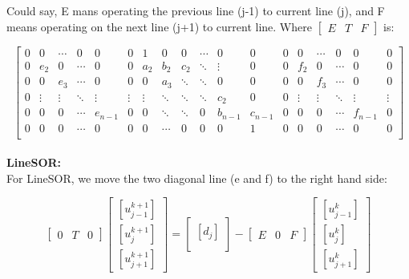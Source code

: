 \documentclass[12pt]{article}
\begin{document}
Could say, E mans operating the previous line (j-1) to current line (j), and F means operating on the next line (j+1) to current line. Where $\left[
\begin{array}{c|c|c}
E & T & F 
\end{array}
\right]$ is:


\[
\left[
\begin{array}{cccccc|cccccc|cccccc}
0 & 0 & \cdots & 0 & 0 & 0 & 1 & 0 & 0 & \cdots & 0 & 0 & 0 & 0 & \cdots & 0 & 0 & 0 \\
0 & e_{2} & 0 & \cdots & 0 & 0 & a_{2} & b_{2} & c_{2} & \ddots & \vdots & 0 & 0 & f_{2} & 0 & \cdots & 0 & 0 \\
0 & 0 & e_{3} & \cdots & 0 & 0 & 0 & a_{3} & \ddots & \ddots & 0 & 0 & 0 & 0 & f_{3} & \cdots & 0 & 0 \\
0 & \vdots & \vdots & \ddots & \vdots & \vdots & \vdots & \ddots & \ddots & \ddots & c_{2} & 0 & 0 & \vdots & \vdots & \ddots & \vdots & \vdots \\
0 & 0 & 0 & \cdots & e_{n-1} & 0 & 0 & \ddots & \ddots & 0 & b_{n-1} & c_{n-1} & 0 & 0 & 0 & \cdots & f_{n-1} & 0 \\
0 & 0 & 0 & \cdots & 0 & 0 & 0 & \cdots & 0 & 0 & 0 & 1 & 0 & 0 & 0 & \cdots & 0 & 0 \\
\end{array}
\right]
\]\\

\textbf{LineSOR:}\\

For LineSOR, we move the two diagonal line (e and f) to the right hand side:

\[
\left[
\begin{array}{c|c|c}
0 & T & 0 
\end{array}
\right]
\begin{bmatrix}
    [u_{j-1}^{k+1}] \\
    [u_{j}^{k+1}] \\
   [ u_{j+1}^{k+1}]
\end{bmatrix}
=
\begin{bmatrix}
    [d_{j}] \\
\end{bmatrix}
-
\left[
\begin{array}{c|c|c}
E & 0 & F 
\end{array}
\right]
\begin{bmatrix}
    [u_{j-1}^{k}] \\
    [u_{j}^{k}] \\
   [ u_{j+1}^{k}]
\end{bmatrix}
\]
\end{document}

